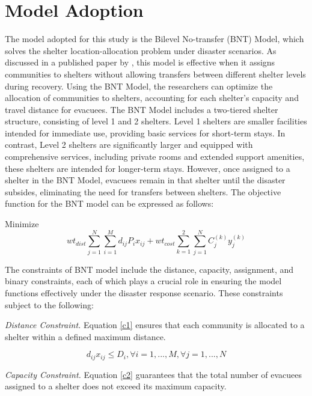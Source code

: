 \section{Model Adoption}
	The model adopted for this study is the Bilevel No-transfer (BNT) Model, which solves the shelter location-allocation problem under disaster scenarios. As discussed in a published paper by \textcite{LeahUP}, this model is effective when it assigns communities to shelters without allowing transfers between different shelter levels during recovery. Using the BNT Model, the researchers can optimize the allocation of communities to shelters, accounting for each shelter’s capacity and travel distance for evacuees.
	The BNT Model includes a two-tiered shelter structure, consisting of level 1 and 2 shelters. Level 1 shelters are smaller facilities intended for immediate use, providing basic services for short-term stays. In contrast, Level 2 shelters are significantly larger and equipped with comprehensive services, including private rooms and extended support amenities, these shelters are intended for longer-term stays. However, once assigned to a shelter in the BNT Model, evacuees remain in that shelter until the disaster subsides, eliminating the need for transfers between shelters.
	The objective function for the BNT model can be expressed as follows:
	
	Minimize 
	\begin{equation}
		wt_{dist}\sum_{j=1}^{N}\sum_{i=1}^{M}d_{ij}P_{i}x_{ij}+wt_{cost}\sum_{k=1}^{2}\sum_{j=1}^{N}C_{j}^{(k)}y_{j}^{(k)} 
	\end{equation}
	
	The constraints of BNT model include the distance, capacity, assignment, and binary constraints, each of which plays a crucial role in ensuring the model functions effectively under the disaster response scenario. These constraints subject to the following: 
	
	\textit{Distance Constraint.} Equation \ref{c1} ensures that each community is allocated to a shelter within a defined maximum distance. 
	
	\begin{equation} 	
		\label{c1}
		d_{ij}x_{ij} \le D_{i}, \forall i = 1,..., M,  \forall j = 1,..., N 
	\end{equation}
	
	\textit{Capacity Constraint.} Equation \ref{c2} guarantees that the total number of evacuees assigned to a shelter does not exceed its maximum capacity. 
	
